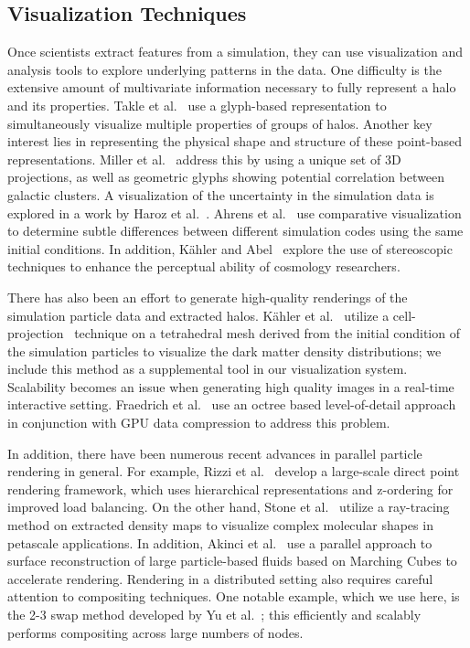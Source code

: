 \subsection{Visualization Techniques}
Once scientists extract features from a simulation, they can use visualization and analysis tools to explore underlying patterns in the data. One difficulty is the extensive amount of multivariate information necessary to fully represent a halo and its properties. Takle et al.~\cite{Tackle:2013} use a glyph-based representation to simultaneously visualize multiple properties of groups of halos. Another key interest lies in representing the physical shape and structure of these point-based representations. Miller et al.~\cite{Miller:2006} address this by using a unique set of 3D projections, as well as geometric glyphs showing potential correlation between galactic clusters. A visualization of the uncertainty in the simulation data is explored in a work by Haroz et al.~\cite{Haroz:2008}. Ahrens et al.~\cite{Ahrens:2006} use comparative visualization to determine subtle differences between different simulation codes using the same initial conditions. In addition, K\"{a}hler and Abel~\cite{Kaehler:2012v2} explore the use of stereoscopic techniques to enhance the perceptual ability of cosmology researchers.

There has also been an effort to generate high-quality renderings of the simulation particle data and extracted halos. K\"{a}hler et al.~\cite{Kaehler:2012} utilize a cell-projection~\cite{max1990area,Rottger2000} technique on a tetrahedral mesh derived from the initial condition of the simulation particles to visualize the dark matter density distributions; we include this method as a supplemental tool in our visualization system. Scalability becomes an issue when generating high quality images in a real-time interactive setting. Fraedrich et al.~\cite{Fraedrich:2009} use an octree based level-of-detail approach in conjunction with GPU data compression to address this problem.

In addition, there have been numerous recent advances in parallel particle rendering in general. For example, Rizzi et al.~\cite{Rizzi:2015} develop a large-scale direct point rendering framework, which uses hierarchical representations and z-ordering for improved load balancing. On the other hand, Stone et al.~\cite{Stone:2013} utilize a ray-tracing method on extracted density maps to visualize complex molecular shapes in petascale applications. In addition, Akinci et al.~\cite{Akinci:2012} use a parallel approach to surface reconstruction of large particle-based fluids based on Marching Cubes to accelerate rendering. Rendering in a distributed setting also requires careful attention to compositing techniques. One notable example, which we use here, is the 2-3 swap method developed by Yu et al.~\cite{23swap}; this efficiently and scalably performs compositing across large numbers of nodes.


